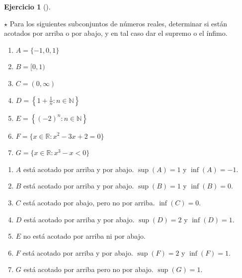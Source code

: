 \documentclass[
  spanish,
  a4paper,
]{scrreport}
\providecommand{\tightlist}{%
  \setlength{\itemsep}{0pt}\setlength{\parskip}{0pt}}
\theoremstyle{definition}
\newtheorem{exercise}{Ejercicio}[chapter]
\theoremstyle{remark}
\begin{document}
\begin{exercise}[]\protect\hypertarget{exr-supremos-infimos-reales}{}\label{exr-supremos-infimos-reales}

\(\star\) Para los siguientes subconjuntos de números reales, determinar
si están acotados por arriba o por abajo, y en tal caso dar el supremo o
el ínfimo.

\begin{enumerate}
\def\labelenumi{\alph{enumi}.}
\tightlist
\item
  \(A = \{-1,0,1\}\)
\item
  \(B= [0,1)\)
\item
  \(C= (0,\infty)\)
\item
  \(D= \left\{1+\frac{1}{n}:n\in\mathbb{N}\right\}\)
\item
  \(E= \left\{(-2)^n:n\in\mathbb{N}\right\}\)
\item
  \(F= \{x\in\mathbb{R}:x^2-3x+2=0\}\)
\item
  \(G= \{x\in\mathbb{R}:x^3-x<0\}\)
\end{enumerate}

\end{exercise}

\begin{tcolorbox}[enhanced jigsaw, arc=.35mm, bottomrule=.15mm, bottomtitle=1mm, breakable, colback=white, colbacktitle=quarto-callout-tip-color!10!white, colframe=quarto-callout-tip-color-frame, coltitle=black, left=2mm, leftrule=.75mm, opacityback=0, opacitybacktitle=0.6, rightrule=.15mm, title=\textcolor{quarto-callout-tip-color}{\faLightbulb}\hspace{0.5em}{Solución}, titlerule=0mm, toprule=.15mm, toptitle=1mm]

\begin{enumerate}
\def\labelenumi{\alph{enumi}.}
\item
  \(A\) está acotado por arriba y por abajo. \(\sup(A)=1\) y
  \(\inf(A)=-1\).
\item
  \(B\) está acotado por arriba y por abajo. \(\sup(B)=1\) y
  \(\inf(B)=0\).
\item
  \(C\) está acotado por abajo, pero no por arriba. \(\inf(C)=0\).
\item
  \(D\) está acotado por arriba y por abajo. \(\sup(D)=2\) y
  \(\inf(D)=1\).
\item
  \(E\) no está acotado por arriba ni por abajo.
\item
  \(F\) está acotado por arriba y por abajo. \(\sup(F)=2\) y
  \(\inf(F)=1\).
\item
  \(G\) está acotado por arriba pero no por abajo. \(\sup(G)=1\).
\end{enumerate}

\end{tcolorbox}
\end{document}
